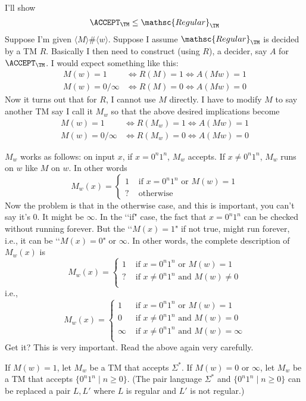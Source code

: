 I'll show
\[
\ACCEPT_\TM \leq \mathsc{Regular}_\TM
\]
Suppose I'm given $\langle M\rangle\#\langle w \rangle$.
Suppose I assume 
$\mathsc{Regular}_\TM$
is decided by a TM $R$.
Basically I then need to construct (using $R$), a decider, say $A$ for
$\ACCEPT_\TM$.
I would expect something like this:
\begin{align*}
M(w) = 1 &\iff R(M) = 1 \iff A(Mw) = 1 \\
M(w) = 0/\infty &\iff R(M) = 0 \iff A(Mw) = 0 
\end{align*}
Now it turns out that for $R$, I cannot use $M$ directly.
I have to modify $M$ to say another TM say I call it $M_w$ so that the
above desired implications become
\begin{align*}
M(w) = 1 &\iff R(M_w) = 1 \iff A(Mw) = 1 \\
M(w) = 0/\infty &\iff R(M_w) = 0 \iff A(Mw) = 0 
\end{align*}

$M_w$ works as follows: on input $x$, if $x = 0^n1^n$, $M_w$ accepts.
If $x \neq 0^n1^n$, $M_w$ runs on $w$ like $M$ on $w$.
In other words
\[
M_w(x) =
\begin{cases}
  1 &\text{ if } x = 0^n1^n \text{ or } M(w) = 1 \\
  ? &\text{ otherwise}
\end{cases}
\]
Now the problem is that in the otherwise case, and this is
important, you can't say it's $0$. It might be $\infty$.
In the \lq\lq if" case, the fact that $x = 0^n1^n$ can be
checked without running forever. But the \lq\lq $M(x) = 1$"
if not true, might run forever, i.e., it can be
\lq\lq $M(x) = 0$" or $\infty$.
In other words, the complete description of $M_w(x)$ is
\[
M_w(x) =
\begin{cases}
  1 &\text{ if } x = 0^n1^n \text{ or } M(w) = 1 \\
  ? &\text{ if } x \neq 0^n1^n \text{ and } M(w) \neq 0 \\
\end{cases}
\]
i.e.,
\[
M_w(x) =
\begin{cases}
  1 &\text{ if } x = 0^n1^n \text{ or } M(w) = 1 \\
  0 &\text{ if } x \neq 0^n1^n \text{ and } M(w) = 0 \\
  \infty &\text{ if } x \neq 0^n1^n \text{ and } M(w) = \infty \\
\end{cases}
\]
Get it? This is very important. Read the above again very carefully.

If $M(w) = 1$, let $M_w$ be a TM that accepts $\Sigma^*$.
If $M(w) = 0$ or $\infty$, let $M_w$ be a TM that accepts
$\{0^n 1^n \mid n \geq 0\}$.
(The pair language $\Sigma^*$ and $\{0^n 1^n \mid n \geq 0\}$
can be replaced a pair $L, L'$ where $L$ is regular
and $L'$ is not regular.)

